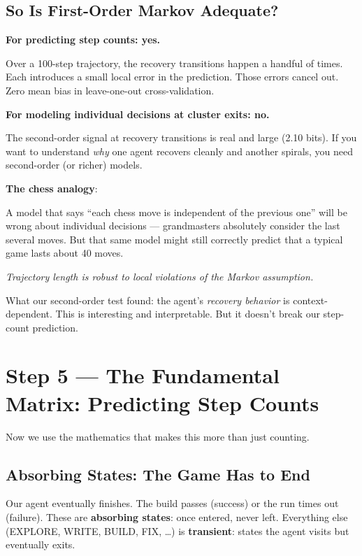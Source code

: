 \documentclass[11pt,a4paper]{article}
\begin{document}
\subsection*{So Is First-Order Markov Adequate?}

\textbf{For predicting step counts: yes.}

Over a 100-step trajectory, the recovery transitions happen a handful of times.
Each introduces a small local error in the prediction.
Those errors cancel out.
Zero mean bias in leave-one-out cross-validation.

\textbf{For modeling individual decisions at cluster exits: no.}

The second-order signal at recovery transitions is real and large (2.10 bits).
If you want to understand \emph{why} one agent recovers cleanly and another spirals,
you need second-order (or richer) models.

\begin{analogybox}
\textbf{The chess analogy}:

A model that says ``each chess move is independent of the previous one''
will be wrong about individual decisions --- grandmasters absolutely consider the last
several moves. But that same model might still correctly predict that a typical game
lasts about 40 moves.

\emph{Trajectory length is robust to local violations of the Markov assumption.}

What our second-order test found: the agent's \emph{recovery behavior}
is context-dependent. This is interesting and interpretable.
But it doesn't break our step-count prediction.
\end{analogybox}

\section{Step 5 --- The Fundamental Matrix: Predicting Step Counts}
\label{sec:fundamental}

Now we use the mathematics that makes this more than just counting.

\subsection*{Absorbing States: The Game Has to End}

Our agent eventually finishes.
The build passes (success) or the run times out (failure).
These are \textbf{absorbing states}: once entered, never left.
Everything else (EXPLORE, WRITE, BUILD, FIX, \ldots) is \textbf{transient}:
states the agent visits but eventually exits.
\end{document}
